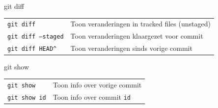 \begin{frame}{git diff}
	\begin{tabular}{ll}
		\texttt{git diff}&Toon veranderingen in tracked files (unstaged)\\
		\texttt{git diff --staged}&Toon veranderingen klaargezet voor commit\\
		\texttt{git diff HEAD\^}&Toon veranderingen sinds vorige commit
	\end{tabular}
\end{frame}

\begin{frame}{git show}
	\begin{tabular}{ll}
		\texttt{git show}&Toon info over vorige commit\\
		\texttt{git show id}&Toon info over commit \texttt{id}\\
	\end{tabular}
\end{frame}
